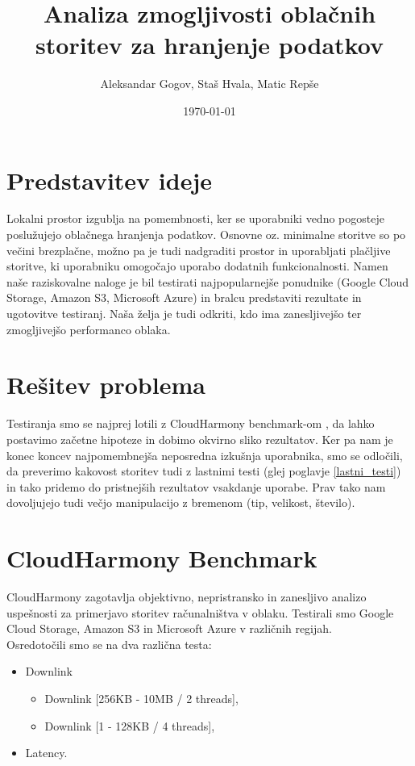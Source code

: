 \documentclass[11pt]{article}
\title{Analiza zmogljivosti oblačnih storitev za hranjenje podatkov}
\author{Aleksandar Gogov, Staš Hvala, Matic Repše}
\date{\today}
\begin{document}
\maketitle


\clearpage
\tableofcontents
\clearpage

\section{Predstavitev ideje}
Lokalni prostor izgublja na pomembnosti, ker se uporabniki vedno pogosteje poslužujejo oblačnega hranjenja podatkov. Osnovne oz. minimalne storitve so po večini brezplačne, možno pa je tudi nadgraditi prostor in uporabljati plačljive storitve, ki uporabniku omogočajo uporabo dodatnih funkcionalnosti. Namen naše raziskovalne naloge je bil testirati najpopularnejše ponudnike (Google Cloud Storage, Amazon S3, Microsoft Azure) in bralcu predstaviti rezultate in ugotovitve testiranj. Naša želja je tudi odkriti, kdo ima zanesljivejšo ter zmogljivejšo performanco oblaka.

\section{Rešitev problema}
Testiranja smo se najprej lotili z CloudHarmony benchmark-om \cite{cloudharm}, da lahko postavimo začetne hipoteze in dobimo okvirno sliko rezultatov. Ker pa nam je konec koncev najpomembnejša neposredna izkušnja uporabnika, smo se odločili, da preverimo kakovost storitev tudi z lastnimi testi (glej poglavje \ref{lastni_testi}) in tako pridemo do pristnejših rezultatov vsakdanje uporabe. Prav tako nam dovoljujejo tudi večjo manipulacijo z bremenom (tip, velikost, število).

\section{CloudHarmony Benchmark} \label{cloudharmony}
CloudHarmony zagotavlja objektivno, nepristransko in zanesljivo analizo uspešnosti za primerjavo storitev računalništva v oblaku. Testirali smo Google Cloud Storage, Amazon S3 in Microsoft Azure v različnih regijah.\\
Osredotočili smo se na dva različna testa:
\begin{itemize}
    \item Downlink
    \begin{itemize}
        \item Downlink [256KB - 10MB / 2 threads],
        \item Downlink [1 - 128KB / 4 threads],
    \end{itemize}
    \item Latency.
\end{itemize}
\end{document}
